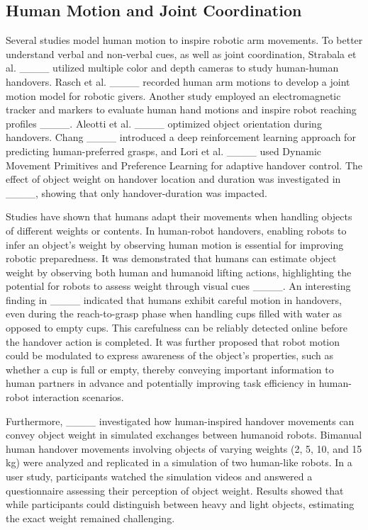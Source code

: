 \subsection{Human Motion and Joint Coordination}
Several studies model human motion to inspire robotic arm movements.
To better understand verbal and non-verbal cues, as well as joint coordination, Strabala et al. ____ utilized multiple color and depth cameras to study human-human handovers. Rasch et al. ____ recorded human arm motions to develop a joint motion model for robotic givers. Another study employed an electromagnetic tracker and markers to evaluate human hand motions and inspire robot reaching profiles ____. Aleotti et al. ____ optimized object orientation during handovers. Chang ____ introduced a deep reinforcement learning approach for predicting human-preferred grasps, and Lori et al. ____ used Dynamic Movement Primitives and Preference Learning for adaptive handover control. 
The effect of object weight on handover location and duration was investigated in ____, showing that only handover-duration was impacted. 

Studies have shown that humans adapt their movements when handling objects of different weights or contents. In human-robot handovers, enabling robots to infer an object's weight by observing human motion is essential for improving robotic preparedness.
It was demonstrated that humans can estimate object weight by observing both human and humanoid lifting actions, highlighting the potential for robots to assess weight through visual cues ____. 
An interesting finding in ____ indicated that humans exhibit careful motion in handovers, even during the reach-to-grasp phase when handling cups filled with water as opposed to empty cups. This carefulness can be reliably detected online before the handover action is completed. It was further proposed that robot motion could be modulated to express awareness of the object's properties, such as whether a cup is full or empty, thereby conveying important information to human partners in advance and potentially improving task efficiency in human-robot interaction scenarios.

Furthermore, ____ investigated how human-inspired handover movements can convey object weight in simulated exchanges between humanoid robots. Bimanual human handover movements involving objects of varying weights (2, 5, 10, and 15 kg) were analyzed and replicated in a simulation of two human-like robots. In a user study, participants watched the simulation videos and answered a questionnaire assessing their perception of object weight. Results showed that while participants could distinguish between heavy and light objects, estimating the exact weight remained challenging.

